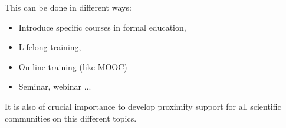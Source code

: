 This can be done in different ways:
\begin{itemize}
\item Introduce specific courses in formal education,
\item Lifelong training,
\item On line training (like MOOC)
\item Seminar, webinar ...
\end{itemize}

It is also of crucial importance to develop proximity support for all
scientific communities on this different topics.
